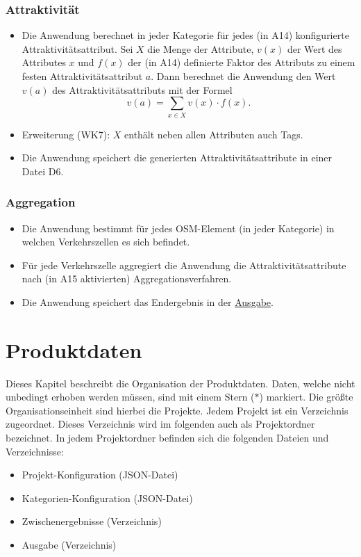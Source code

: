 \documentclass[parskip=full]{scrartcl} %
\begin{document}
\subsubsection*{Attraktivität}
\begin{itemize}
    \item Die Anwendung berechnet in jeder Kategorie für jedes (in A14) konfigurierte Attraktivitätsattribut. Sei $X$ die Menge der Attribute, $v(x)$ der Wert des Attributes $x$ und $f(x)$ der (in A14) definierte Faktor des Attributs zu einem festen Attraktivitätsattribut $a$. Dann berechnet die Anwendung den Wert $v(a)$ des Attraktivitätsattributs mit der Formel $$v(a)=\sum_{x\in X}{v(x)\cdot f(x)}.$$
    \item Erweiterung (WK7): $X$ enthält neben allen Attributen auch Tags.
    \item Die Anwendung speichert die generierten Attraktivitätsattribute in einer Datei D6.
\end{itemize}

\subsubsection*{Aggregation}
\begin{itemize}
    \item Die Anwendung bestimmt für jedes OSM-Element (in jeder Kategorie) in welchen Verkehrszellen es sich befindet.
    \item Für jede Verkehrszelle aggregiert die Anwendung die Attraktivitätsattribute nach (in A15 aktivierten) Aggregationsverfahren.
    \item Die Anwendung speichert das Endergebnis in der \hyperlink{finalresult}{Ausgabe}.
\end{itemize}
\newpage





\section{Produktdaten} \hypertarget{data}{}
Dieses Kapitel beschreibt die Organisation der Produktdaten. Daten, welche nicht unbedingt erhoben werden müssen, sind mit einem Stern ($\ast$) markiert. Die größte Organisationseinheit sind hierbei die Projekte. Jedem Projekt ist ein Verzeichnis zugeordnet. Dieses Verzeichnis wird im folgenden auch als Projektordner bezeichnet. In jedem Projektordner befinden sich die folgenden Dateien und Verzeichnisse:
\begin{itemize}
    \item Projekt-Konfiguration (JSON-Datei)
    \item Kategorien-Konfiguration (JSON-Datei)
    \item Zwischenergebnisse (Verzeichnis)
    \item Ausgabe (Verzeichnis)
\end{itemize}
\end{document}
